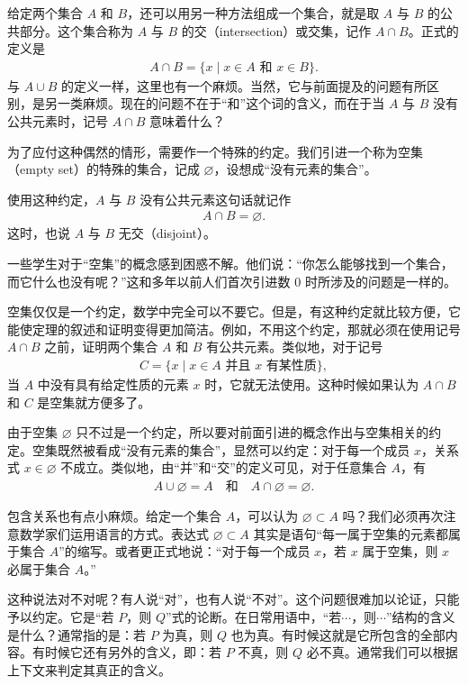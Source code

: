 \documentclass[../../main.tex]{subfiles}
\begin{document}
给定两个集合 $A$ 和 $B$，还可以用另一种方法组成一个集合，就是取 $A$ 与 $B$ 的公共部分。这个集合称为 $A$ 与 $B$ 的交（intersection）或交集，记作 $A \cap B$。正式的定义是
\begin{align}
A \cap B = \{x \mid x \in A \text{ 和 } x \in B\}.\label{align:ch01-交定义}
\end{align}
与 $A \cup B$ 的定义一样，这里也有一个麻烦。当然，它与前面提及的问题有所区别，是另一类麻烦。现在的问题不在于“和”这个词的含义，而在于当 $A$ 与 $B$ 没有公共元素时，记号 $A \cap B$ 意味着什么？

为了应付这种偶然的情形，需要作一个特殊的约定。我们引进一个称为空集（empty set）的特殊的集合，记成 $\varnothing$，设想成“没有元素的集合”。

使用这种约定，$A$ 与 $B$ 没有公共元素这句话就记作
\begin{align*}
A \cap B = \varnothing.
\end{align*}
这时，也说 $A$ 与 $B$ 无交（disjoint）。

一些学生对于“空集”的概念感到困惑不解。他们说：“你怎么能够找到一个集合，而它什么也没有呢？”这和多年以前人们首次引进数 $0$ 时所涉及的问题是一样的。

空集仅仅是一个约定，数学中完全可以不要它。但是，有这种约定就比较方便，它能使定理的叙述和证明变得更加简洁。例如，不用这个约定，那就必须在使用记号 $A \cap B$ 之前，证明两个集合 $A$ 和 $B$ 有公共元素。类似地，对于记号
\begin{align*}
C = \{x \mid x \in A \text{ 并且 } x \text{ 有某性质}\},
\end{align*}
当 $A$ 中没有具有给定性质的元素 $x$ 时，它就无法使用。这种时候如果认为 $A \cap B$ 和 $C$ 是空集就方便多了。

由于空集 $\varnothing$ 只不过是一个约定，所以要对前面引进的概念作出与空集相关的约定。空集既然被看成“没有元素的集合”，显然可以约定：对于每一个成员 $x$，关系式 $x \in \varnothing$ 不成立。类似地，由“并”和“交”的定义可见，对于任意集合 $A$，有
\begin{align*}
A \cup \varnothing = A \quad \text{和} \quad A \cap \varnothing = \varnothing.
\end{align*}

包含关系也有点小麻烦。给定一个集合 $A$，可以认为 $\varnothing \subset A$ 吗？我们必须再次注意数学家们运用语言的方式。表达式 $\varnothing \subset A$ 其实是语句“每一属于空集的元素都属于集合 $A$”的缩写。或者更正式地说：“对于每一个成员 $x$，若 $x$ 属于空集，则 $x$ 必属于集合 $A$。”

这种说法对不对呢？有人说“对”，也有人说“不对”。这个问题很难加以论证，只能予以约定。它是“若 $P$，则 $Q$”式的论断。在日常用语中，“若$\cdots$，则$\cdots$”结构的含义是什么？通常指的是：若 $P$ 为真，则 $Q$ 也为真。有时候这就是它所包含的全部内容。有时候它还有另外的含义，即：若 $P$ 不真，则 $Q$ 必不真。通常我们可以根据上下文来判定其真正的含义。
\end{document}

